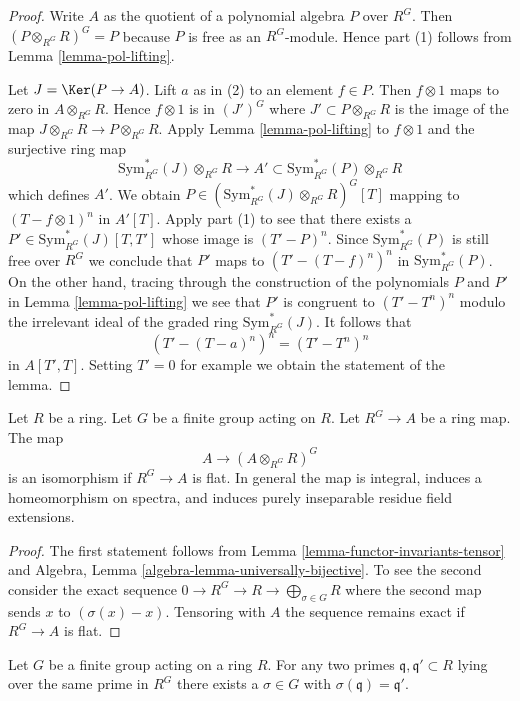 \begin{proof}
Write $A$ as the quotient of a polynomial algebra $P$ over $R^G$.
Then $(P \otimes_{R^G} R)^G = P$ because $P$ is free as an $R^G$-module.
Hence part (1) follows from Lemma \ref{lemma-pol-lifting}.

\medskip\noindent
Let $J = \Ker(P \to A)$. Lift $a$ as in (2) to an element $f \in P$.
Then $f \otimes 1$ maps to zero in $A \otimes_{R^G} R$.
Hence $f \otimes 1$ is in $(J')^G$ where $J' \subset P \otimes_{R^G} R$
is the image of the map $J \otimes_{R^G} R \to P \otimes_{R^G} R$.
Apply Lemma \ref{lemma-pol-lifting} to $f \otimes 1$
and the surjective ring map
$$
\text{Sym}^*_{R^G}(J) \otimes_{R^G} R
\longrightarrow
A' \subset \text{Sym}^*_{R^G}(P) \otimes_{R^G} R
$$
which defines $A'$. We obtain
$P \in (\text{Sym}^*_{R^G}(J) \otimes_{R^G} R)^G[T]$
mapping to $(T - f \otimes 1)^n$ in $A'[T]$.
Apply part (1) to see that there exists a
$P' \in \text{Sym}^*_{R^G}(J)[T, T']$ whose image
is $(T' - P)^n$. Since $\text{Sym}_{R^G}^*(P)$ is still
free over $R^G$ we conclude that $P'$ maps to $(T' - (T - f)^n)^n$
in $\text{Sym}_{R^G}^*(P)$. On the other hand, tracing through
the construction of the polynomials $P$ and $P'$ in
Lemma \ref{lemma-pol-lifting}
we see that $P'$ is congruent to $(T' - T^n)^n$ modulo
the irrelevant ideal of the graded ring $\text{Sym}^*_{R^G}(J)$.
It follows that
$$
(T' - (T - a)^n)^n = (T' - T^n)^n
$$
in $A[T', T]$. Setting $T' = 0$ for example we obtain the statement
of the lemma.
\end{proof}

\begin{lemma}
\label{lemma-base-change-invariants}
Let $R$ be a ring. Let $G$ be a finite group acting on $R$.
Let $R^G \to A$ be a ring map. The map
$$
A \to (A \otimes_{R^G} R)^G
$$
is an isomorphism if $R^G \to A$ is flat. In general the map
is integral, induces a homeomorphism on spectra, and
induces purely inseparable residue field extensions.
\end{lemma}

\begin{proof}
The first statement follows from Lemma \ref{lemma-functor-invariants-tensor}
and Algebra, Lemma \ref{algebra-lemma-universally-bijective}.
To see the second consider the
exact sequence $0 \to R^G \to R \to \bigoplus_{\sigma \in G} R$
where the second map sends $x$ to $(\sigma(x) - x)$. Tensoring with
$A$ the sequence remains exact if $R^G \to A$ is flat.
\end{proof}

\begin{lemma}
\label{lemma-one-orbit}
Let $G$ be a finite group acting on a ring $R$. For any two primes
$\mathfrak q, \mathfrak q' \subset R$ lying over the same prime in $R^G$
there exists a $\sigma \in G$ with $\sigma(\mathfrak q) = \mathfrak q'$.
\end{lemma}

